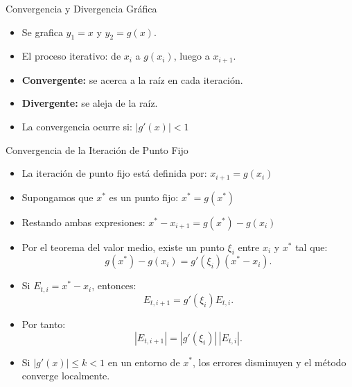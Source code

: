 \documentclass[../../main.tex]{subfiles}
\begin{document}
\begin{frame}{Convergencia y Divergencia Gráfica}
\begin{itemize}
  \item Se grafica \( y_1 = x \) y \( y_2 = g(x) \).
  \item El proceso iterativo: de \( x_i \) a \( g(x_i) \), luego a \( x_{i+1} \).
  \item \textbf{Convergente:} se acerca a la raíz en cada iteración.
  \item \textbf{Divergente:} se aleja de la raíz.
  \item La convergencia ocurre si: \( |g'(x)| < 1 \)
\end{itemize}
\end{frame}



\begin{frame}{Convergencia de la Iteración de Punto Fijo}

\begin{itemize}
  \item La iteración de punto fijo está definida por: \(x_{i+1}=g(x_i)\)
  \item Supongamos que \(x^*\) es un punto fijo: \(x^*=g(x^*)\)
  \item Restando ambas expresiones: \(x^*-x_{i+1}=g(x^*)-g(x_i) \)
  \item Por el teorema del valor medio, existe un punto
  \(\xi_i\) entre \(x_i\) y \(x^*\) tal que:
  \[
    g(x^*)-g(x_i)=g'(\xi_i)(x^*-x_i).
  \]

  \item Si \(E_{t,i}=x^*-x_i\), entonces:
  \[
    E_{t,i+1}=g'(\xi_i)E_{t,i}.
  \]

  \item Por tanto:
  \[
    |E_{t,i+1}|=|g'(\xi_i)|\,|E_{t,i}|.
  \]

  \item Si \(|g'(x)|\leq k<1\) en un entorno de \(x^*\),
  los errores disminuyen y el método converge localmente.
\end{itemize}

\end{frame}


\end{document}
